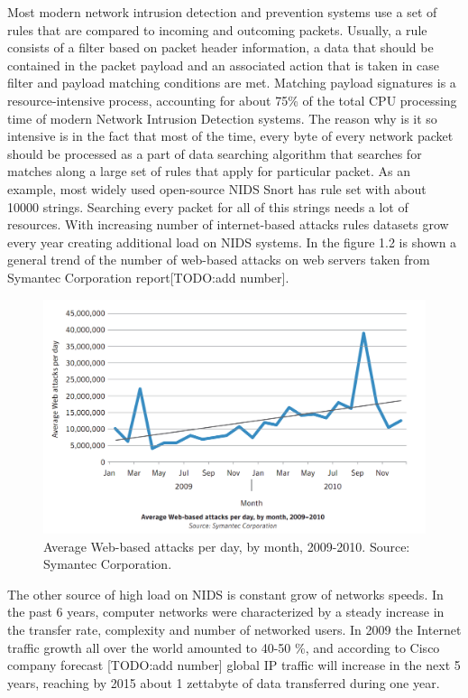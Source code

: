 \documentclass[thesis=M,english]{FITthesis}[2011/07/15]
\begin{document}
Most modern network intrusion detection and prevention systems use a set of rules that are compared to incoming and outcoming packets. Usually, a rule consists of a filter based on packet header information, a data that should be contained in the packet payload and an associated action that is taken in case filter and payload matching conditions are met.
Matching payload signatures is a resource-intensive process, accounting for about 75\% of the total CPU processing time of modern Network Intrusion Detection systems. The reason why is it so intensive is in the fact that most of the time, every byte of every network packet should be processed as a part of data searching algorithm that searches for matches along a large set of rules that apply for particular packet. As an example, most widely used open-source NIDS Snort has rule set with about 10000 strings. Searching every packet for all of this strings needs a lot of resources. With increasing number of internet-based attacks rules datasets grow every year creating additional load on NIDS systems. In the figure 1.2 is shown a general trend of the number of web-based attacks on web servers taken from Symantec Corporation report[TODO:add number].
\begin{figure}
\centering
\includegraphics[scale=0.3]{images/web-attacks.png}
\caption{Average Web-based attacks per day, by month, 2009-2010. Source: Symantec Corporation.}
\end{figure}

The other source of high load on NIDS is constant grow of networks speeds. In the past 6 years, computer networks were characterized by a steady increase in the transfer rate, complexity and number of networked users. In 2009 the Internet traffic growth all over the world amounted to 40-50 \%, and according to Cisco company forecast [TODO:add number] global IP traffic will increase in the next 5 years, reaching by 2015 about 1 zettabyte of data transferred during one year.
\end{document}
